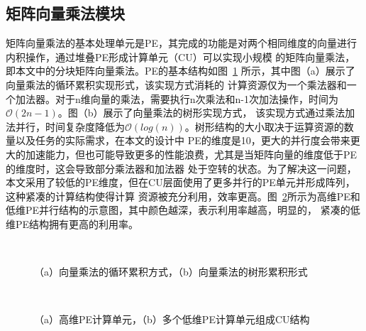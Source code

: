 \subsection{矩阵向量乘法模块}
矩阵向量乘法的基本处理单元是PE，其完成的功能是对两个相同维度的向量进行内积操作，通过堆叠PE形成计算单元（CU）可以实现小规模
的矩阵向量乘法，即本文中的分块矩阵向量乘法。PE的基本结构如图~\ref{fig:MVM} 所示，其中图（a）展示了向量乘法的循环累积实现形式，该实现方式消耗的
计算资源仅为一个乘法器和一个加法器。对于n维向量的乘法，需要执行n次乘法和n-1次加法操作，时间为\(\mathcal{O}(2n-1)\)。图（b）展示了向量乘法的树形实现方式，
该实现方式通过乘法加法并行，时间复杂度降低为\(\mathcal{O}(log(n))\)。树形结构的大小取决于运算资源的数量以及任务的实际需求，在本文的设计中
PE的维度是10，更大的并行度会带来更大的加速能力，但也可能导致更多的性能浪费，尤其是当矩阵向量的维度低于PE的维度时，这会导致部分乘法器和加法器
处于空转的状态。为了解决这一问题，本文采用了较低的PE维度，但在CU层面使用了更多并行的PE单元并形成阵列，这种紧凑的计算结构使得计算
资源被充分利用，效率更高。图~\ref{fig:MVM_long}所示为高维PE和低维PE并行结构的示意图，其中颜色越深，表示利用率越高，明显的，
紧凑的低维PE结构拥有更高的利用率。
\begin{figure}[htbp]
	\centering
			\\
	\caption{（a）向量乘法的循环累积方式，（b）向量乘法的树形累积形式}
\label{fig:MVM}
\end{figure}
\begin{figure}[htbp]
	\centering
			\\
	\caption{（a）高维PE计算单元，（b）多个低维PE计算单元组成CU结构}
\label{fig:MVM_long}
\end{figure}


